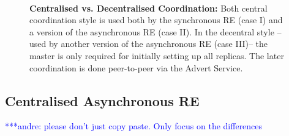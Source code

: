 \documentclass{rspublic}
\newcommand{\alnote}[1]{ {\textcolor{blue} { ***andre: #1 }}}
\newcommand{\alnote}[1]{}
\begin{document}

\begin{figure}%
\centering
{}\qquad
{}\\
\caption{\textbf{Centralised vs. Decentralised Coordination:} Both central coordination style
is used both by the synchronous RE (case I) and a version of the asynchronous RE (case II). 
In the decentral style -- used by another version of the asynchronous RE (case III)-- the master is only required
for initially setting up all replicas. The later coordination is done peer-to-peer via the Advert Service.}
\label{fig:coordination}
\end{figure}


\subsection{Centralised Asynchronous RE}
\alnote{please don't just copy paste. Only focus on the differences}
\end{document}
